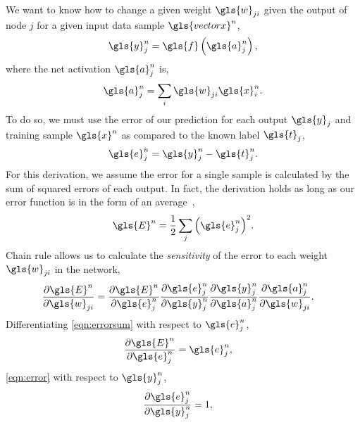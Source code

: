 \documentclass[thesis]{subfiles}
\begin{document}
We want to know how to change a given weight $\gls{w}_{ji}$ given the output of node $j$ for a given input data sample $\gls{vectorx}^n$, 
\begin{equation}
	\gls{y}^n_j = \gls{f}\left( \gls{a}^n_j \right),
	\label{eqn:output}
\end{equation}
where the net activation $\gls{a}^n_j$ is,
\begin{equation}
	\gls{a}^n_j = \sum_i \gls{w}_{ji} \gls{x}^n_{i}.
	\label{eqn:weightsum}
\end{equation}
To do so, we must use the error of our prediction for each output $\gls{y}_j$ and training sample $\gls{x}^n$ as compared to the known label $\gls{t}_j$,
\begin{equation}
    \gls{e}^n_j = \gls{y}^n_j - \gls{t}^n_j.
    \label{eqn:error}
\end{equation}
%
For this derivation, we assume the error for a single sample is calculated by the sum of squared errors of each output. In fact, the derivation holds as long as our error function is in the form of an average~\citep{Bishop1995},
\begin{equation}
    \gls{E}^n = \frac{1}{2} \sum_j {\left(\gls{e}^n_j\right)}^2.
    \label{eqn:errorsum}
\end{equation}
Chain rule allows us to calculate the \emph{sensitivity} of the error to each weight $\gls{w}_{ji}$ in the network,
\begin{equation}
\begin{aligned}
    \frac{\partial \gls{E}^n}{\partial \gls{w}_{ji}} &= \frac{\partial \gls{E}^n}{\partial \gls{e}^n_j}\frac{\partial \gls{e}^n_j}{\partial \gls{y}^n_j} \frac{\partial \gls{y}^n_j}{\partial \gls{a}^n_j} \frac{\partial \gls{a}^n_j}{\partial \gls{w}_{ji}}.
\end{aligned}
\end{equation}
%
Differentiating \cref{eqn:errorsum} with respect to $\gls{e}^n_j$,
\begin{equation}
\begin{aligned}
    \frac{\partial \gls{E}^n}{\partial \gls{e}^n_j} &= \gls{e}^n_j,
\end{aligned}
\end{equation}
%
\cref{eqn:error} with respect to $\gls{y}^n_j$,
\begin{equation}
\begin{aligned}
    \frac{\partial \gls{e}^n_j}{\partial \gls{y}^n_j} &= 1,
\end{aligned}
\end{equation}
%
\end{document}
